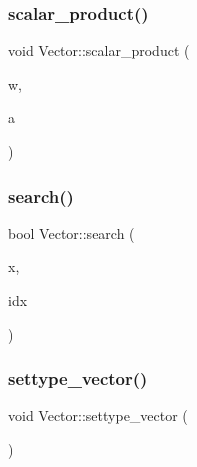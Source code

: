 \mbox{\label{class_vector_acb27c83b81fc462996cca982f0c6f07c}} 
\subsubsection{\texorpdfstring{scalar\+\_\+product()}{scalar\_product()}}
{\footnotesize\ttfamily void Vector\+::scalar\+\_\+product (\begin{DoxyParamCaption}\item[{\mbox{\hyperlink{class_vector}{Vector}} \&}]{w,  }\item[{\mbox{\hyperlink{classdiscreta__base}{discreta\+\_\+base}} \&}]{a }\end{DoxyParamCaption})}

\mbox{\label{class_vector_a0b2bba0162e65dffa24b4e4660bfd4e2}} 
\subsubsection{\texorpdfstring{search()}{search()}}
{\footnotesize\ttfamily bool Vector\+::search (\begin{DoxyParamCaption}\item[{\mbox{\hyperlink{classdiscreta__base}{discreta\+\_\+base}} \&}]{x,  }\item[{\mbox{\hyperlink{galois_8h_a09fddde158a3a20bd2dcadb609de11dc}{I\+NT}} $\ast$}]{idx }\end{DoxyParamCaption})}

\mbox{\label{class_vector_a34e0d00b18c051f23904a8429fa6c8b4}} 
\subsubsection{\texorpdfstring{settype\+\_\+vector()}{settype\_vector()}}
{\footnotesize\ttfamily void Vector\+::settype\+\_\+vector (\begin{DoxyParamCaption}{ }\end{DoxyParamCaption})}

\mbox{\label{class_vector_ae50ef8643d10e954cb3b34cb33ce97e9}} 
